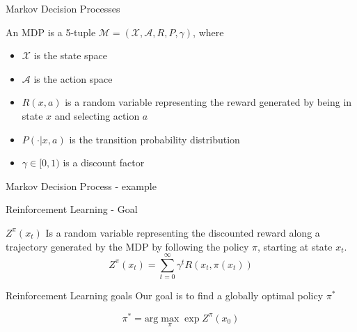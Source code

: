 \documentclass{beamer}
\begin{document}
\begin{frame}{Markov Decision Processes}

\begin{definition}
An MDP is a 5-tuple $\mathcal{M} = (\mathcal{X}, \mathcal{A}, R, P, \gamma)$, where

\begin{itemize}
\item $\mathcal{X}$ is the state space
\item $\mathcal{A}$ is the action space
\item $R(x, a)$ is a random variable representing the reward generated by being in state $x$ and selecting action $a$
\item $P(\cdot|x, a)$ is the transition probability distribution
\item $\gamma \in [0, 1)$ is a discount factor
\end{itemize}
\end{definition}

\end{frame}


\begin{frame}{Markov Decision Process - example}

\center
{}
\end{frame}


\begin{frame}{Reinforcement Learning - Goal}
\begin{definition}
$Z^\pi(x_t)$ Is a random variable representing the discounted reward along a trajectory generated by the MDP by following the policy $\pi$, starting at state $x_t$.
$$Z^\pi(x_{t})=\sum_{t=0}^\infty \gamma^tR(x_t,\pi(x_t))$$
\end{definition}

\begin{block}{Reinforcement Learning goals}
Our goal is to find a globally optimal policy $\pi^*$

$$\pi^* = \text{arg}\max_\pi \exp Z^\pi(x_0)$$
\end{block}

\end{frame}

\end{document}
